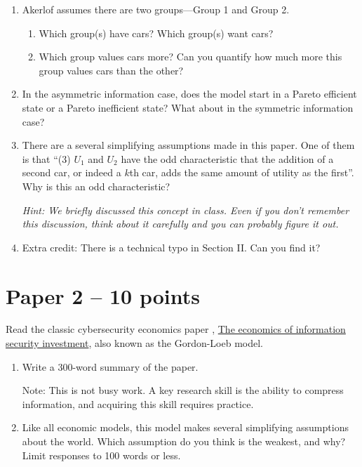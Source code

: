 \documentclass[11pt]{article}
\begin{document}
\begin{enumerate}
    \item Akerlof assumes there are two groups---Group 1 and Group 2. 
    \begin{enumerate}
        \item Which group(s) have cars? Which group(s) want cars?
        \item Which group values cars more? Can you quantify how much more this group values cars than the other?
    \end{enumerate}
    \item In the asymmetric information case, does the model start in a Pareto efficient state or a Pareto inefficient state? What about in the symmetric information case?
    \item There are a several simplifying assumptions made in this paper. One of them is that ``(3) $U_1$ and $U_2$ have the odd characteristic that the addition of a second car, or indeed a $k$th car, adds the same amount of utility as the first''. Why is this an odd characteristic? 
    
    \textit{Hint: We briefly discussed this concept in class. Even if you don't remember this discussion, think about it carefully and you can probably figure it out.}

    \item Extra credit: There is a technical typo in Section II. Can you find it?
\end{enumerate}

\section{Paper 2 -- 10 points}

Read the classic cybersecurity economics paper , \href{https://dl.acm.org/doi/abs/10.1145/581271.581274}{The economics of information security investment}, also known as the Gordon-Loeb model.

\begin{enumerate}
    \item Write a 300-word summary of the paper. 
    
    Note: This is not busy work. A key research skill is the ability to compress information, and acquiring this skill requires practice.
    \item Like all economic models, this model makes several simplifying assumptions about the world. Which assumption do you think is the weakest, and why? Limit responses to 100 words or less.
\end{enumerate}
\end{document}

